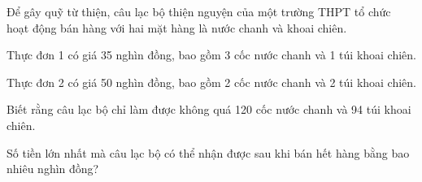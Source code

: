 \begin{ex}
 Để gây quỹ từ thiện, câu lạc bộ thiện nguyện của một trường THPT tổ chức hoạt động bán hàng với hai mặt hàng là nước chanh và khoai chiên.

Thực đơn 1 có giá 35 nghìn đồng, bao gồm 3 cốc nước chanh và 1 túi khoai chiên.

Thực đơn 2 có giá 50 nghìn đồng, bao gồm 2 cốc nước chanh và 2 túi khoai chiên.

Biết rằng câu lạc bộ chỉ làm được không quá 120 cốc nước chanh và 94 túi khoai chiên.

Số tiền lớn nhất mà câu lạc bộ có thể nhận được sau khi bán hết hàng bằng bao nhiêu nghìn đồng?


\end{ex}

